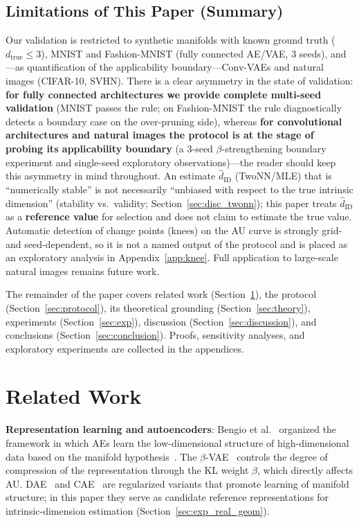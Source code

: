 \documentclass[make,article,submit,pdftex,moreauthors]{Definitions/mdpi}
\newcommand{\hatdID}{\hat{d}_{\mathrm{ID}}}
\newcommand{\dtrue}{d_{\mathrm{true}}}
\begin{document}
\subsection{Limitations of This Paper (Summary)}\label{sec:intro_limits}

Our validation is restricted to synthetic manifolds with known ground truth
($\dtrue \leq 3$), MNIST and Fashion-MNIST (fully connected AE/VAE,
3 seeds), and---as quantification of
the applicability boundary---Conv-VAEs and natural images (CIFAR-10, SVHN).
There is a clear asymmetry in the state of validation:
\textbf{for fully connected architectures we provide complete multi-seed
validation} (MNIST passes the rule; on Fashion-MNIST the rule
diagnostically detects a boundary case on the over-pruning side), whereas
\textbf{for convolutional architectures and natural images the protocol is
at the stage of probing its applicability boundary} (a 3-seed
$\beta$-strengthening boundary experiment and single-seed exploratory
observations)---the reader should keep this asymmetry in mind throughout.
An estimate $\hatdID$ (TwoNN/MLE) that is ``numerically stable'' is not
necessarily ``unbiased with respect to the true intrinsic dimension''
(stability vs.\ validity; Section~\ref{sec:disc_twonn}); this paper treats
$\hatdID$ as a \textbf{reference value} for selection and does not claim to
estimate the true value.
Automatic detection of change points (knees) on the AU curve is strongly
grid- and seed-dependent, so it is not a named output of the protocol and is
placed as an exploratory analysis in Appendix~\ref{app:knee}.
Full application to large-scale natural images remains future work.

The remainder of the paper covers related work (Section~\ref{sec:related}),
the protocol (Section~\ref{sec:protocol}), its theoretical grounding
(Section~\ref{sec:theory}), experiments (Section~\ref{sec:exp}), discussion
(Section~\ref{sec:discussion}), and conclusions
(Section~\ref{sec:conclusion}).
Proofs, sensitivity analyses, and exploratory experiments are collected in
the appendices.

\section{Related Work}\label{sec:related}

\textbf{Representation learning and autoencoders}:
Bengio et al.~\cite{bengio2013representation} organized the framework in
which AEs learn the low-dimensional structure of high-dimensional data based
on the manifold hypothesis~\cite{fefferman2016manifold}.
The $\beta$-VAE~\cite{higgins2017betavae} controls the degree of compression
of the representation through the KL weight $\beta$, which directly affects
AU.
DAE~\cite{alain2014dae} and CAE~\cite{rifai2011cae} are regularized variants
that promote learning of manifold structure; in this paper they serve as
candidate reference representations for intrinsic-dimension estimation
(Section~\ref{sec:exp_real_geom}).
\end{document}
